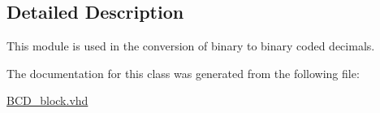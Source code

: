 \subsection{Detailed Description}
This module is used in the conversion of binary to binary coded decimals. 

The documentation for this class was generated from the following file\-:\begin{DoxyCompactItemize}
\item 
\hyperlink{BCD__block_8vhd}{B\-C\-D\-\_\-block.\-vhd}\end{DoxyCompactItemize}
